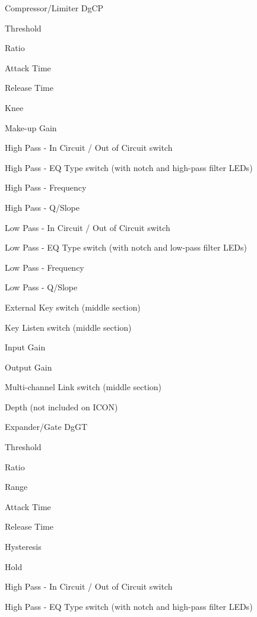 \begin{DoxyItemize}
\item Compressor/\+Limiter {\ttfamily \textquotesingle{}Dg\+C\+P\textquotesingle{}}  
\begin{DoxyEnumerate}
\item Threshold  
\item Ratio  
\item Attack Time  
\item Release Time  
\item Knee  
\item Make-\/up Gain  
\item High Pass -\/ In Circuit / Out of Circuit switch  
\item High Pass -\/ E\+Q Type switch (with notch and high-\/pass filter L\+E\+Ds) 
\item High Pass -\/ Frequency  
\item High Pass -\/ Q/\+Slope  
\item Low Pass -\/ In Circuit / Out of Circuit switch  
\item Low Pass -\/ E\+Q Type switch (with notch and low-\/pass filter L\+E\+Ds) 
\item Low Pass -\/ Frequency  
\item Low Pass -\/ Q/\+Slope  
\item External Key switch (middle section)  
\item Key Listen switch (middle section)  
\item Input Gain  
\item Output Gain  
\item Multi-\/channel Link switch (middle section)  
\item Depth (not included on I\+C\+O\+N)  
\end{DoxyEnumerate}
\item Expander/\+Gate {\ttfamily \textquotesingle{}Dg\+G\+T\textquotesingle{}}  
\begin{DoxyEnumerate}
\item Threshold  
\item Ratio  
\item Range  
\item Attack Time  
\item Release Time  
\item Hysteresis  
\item Hold  
\item High Pass -\/ In Circuit / Out of Circuit switch  
\item High Pass -\/ E\+Q Type switch (with notch and high-\/pass filter L\+E\+Ds) 

\end{DoxyEnumerate}
\end{DoxyItemize}
